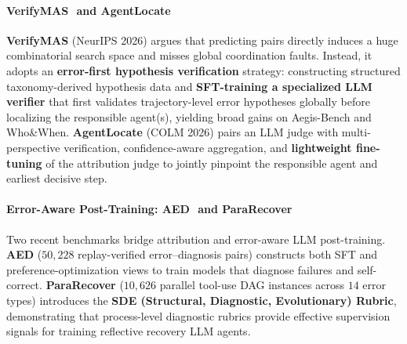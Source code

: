 \paragraph{VerifyMAS~\citep{qiao2026verifymas}\,\webtag and AgentLocate~\citep{xia2026agentlocate}\,\webtag}
\textbf{VerifyMAS} (NeurIPS 2026) argues that predicting  pairs directly induces a huge combinatorial search space and misses global coordination faults. Instead, it adopts an \textbf{error-first hypothesis verification} strategy: constructing structured taxonomy-derived hypothesis data and \textbf{SFT-training a specialized LLM verifier} that first validates trajectory-level error hypotheses globally before localizing the responsible agent(s), yielding broad gains on Aegis-Bench and Who\&When. \textbf{AgentLocate} (COLM 2026) pairs an LLM judge with multi-perspective verification, confidence-aware aggregation, and \textbf{lightweight fine-tuning} of the attribution judge to jointly pinpoint the responsible agent and earliest decisive step.

\paragraph{Error-Aware Post-Training: AED~\citep{zhu2026aed}\,\webtag and ParaRecover~\citep{guan2026pararecover}}
Two recent benchmarks bridge attribution and error-aware LLM post-training. \textbf{AED} ($50{,}228$ replay-verified error--diagnosis pairs) constructs both SFT and preference-optimization views to train models that diagnose failures and self-correct. \textbf{ParaRecover} ($10{,}626$ parallel tool-use DAG instances across $14$ error types) introduces the \textbf{SDE (Structural, Diagnostic, Evolutionary) Rubric}, demonstrating that process-level diagnostic rubrics provide effective supervision signals for training reflective recovery LLM agents.

